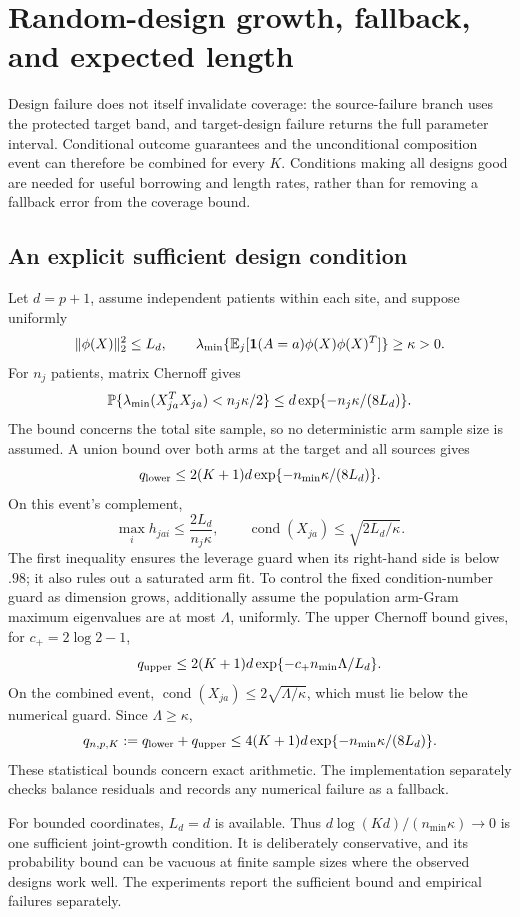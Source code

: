 \section{Random-design growth, fallback, and expected length}
\label{sec:design-stability}

Design failure does not itself invalidate coverage: the source-failure branch
uses the protected target band, and target-design failure returns the full
parameter interval. Conditional outcome guarantees and the unconditional
composition event can therefore be combined for every $K$. Conditions making
all designs good are needed for useful borrowing and length rates, rather
than for removing a fallback error from the coverage bound.

\subsection{An explicit sufficient design condition}

Let $d=p+1$, assume independent patients within each site, and suppose uniformly
\[
 \|\phi(X)\|_2^2\le L_d,\qquad
 \lambda_{\min}\{\mathbb E_j[\mathbf 1(A=a)\phi(X)\phi(X)^T]\}\ge\kappa>0.
\]
For $n_j$ patients, matrix Chernoff \citep[Corollary 5.2]{tropp2012} gives
\[
 \mathbb P\{\lambda_{\min}(X_{ja}^TX_{ja})<n_j\kappa/2\}
 \le d\exp\{-n_j\kappa/(8L_d)\}.
\]
The bound concerns the total site sample, so no deterministic arm sample size
is assumed. A union bound over both arms at the target and all sources gives
\[
 q_{\rm lower}\le 2(K+1)d\exp\{-n_{\min}\kappa/(8L_d)\}.
\]
On this event's complement,
\[
 \max_i h_{jai}\le\frac{2L_d}{n_j\kappa},\qquad
 \operatorname{cond}(X_{ja})\le\sqrt{2L_d/\kappa}.
\]
The first inequality ensures the leverage guard when its right-hand side is
below $.98$; it also rules out a saturated arm fit. To control the fixed
condition-number guard as dimension grows, additionally assume the population
arm-Gram maximum eigenvalues are at most $\Lambda$, uniformly. The upper
Chernoff bound gives, for $c_+=2\log2-1$,
\[
 q_{\rm upper}\le 2(K+1)d\exp\{-c_+n_{\min}\Lambda/L_d\}.
\]
On the combined event, $\operatorname{cond}(X_{ja})\le2\sqrt{\Lambda/\kappa}$,
which must lie below the numerical guard. Since $\Lambda\ge\kappa$,
\[
 q_{n,p,K}:=q_{\rm lower}+q_{\rm upper}
 \le4(K+1)d\exp\{-n_{\min}\kappa/(8L_d)\}.
\]
These statistical bounds concern exact arithmetic. The implementation separately
checks balance residuals and records any numerical failure as a fallback.

For bounded coordinates, $L_d=d$ is available. Thus
$d\log(Kd)/(n_{\min}\kappa)\to0$ is one sufficient joint-growth condition.
It is deliberately conservative, and its probability bound can be vacuous at
finite sample sizes where the observed designs work well. The experiments
report the sufficient bound and empirical failures separately.


